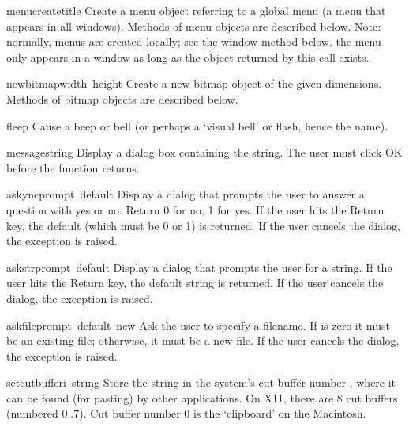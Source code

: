 \begin{funcdesc}{menucreate}{title}
Create a menu object referring to a global menu (a menu that appears in
all windows).
Methods of menu objects are described below.
Note: normally, menus are created locally; see the window method
 below.
 the menu only appears in a window as long as the object
returned by this call exists.
\end{funcdesc}

\begin{funcdesc}{newbitmap}{width\, height}
Create a new bitmap object of the given dimensions.
Methods of bitmap objects are described below.
\end{funcdesc}

\begin{funcdesc}{fleep}{}
Cause a beep or bell (or perhaps a `visual bell' or flash, hence the
name).
\end{funcdesc}

\begin{funcdesc}{message}{string}
Display a dialog box containing the string.
The user must click OK before the function returns.
\end{funcdesc}

\begin{funcdesc}{askync}{prompt\, default}
Display a dialog that prompts the user to answer a question with yes or
no.
Return 0 for no, 1 for yes.
If the user hits the Return key, the default (which must be 0 or 1) is
returned.
If the user cancels the dialog, the
exception is raised.
\end{funcdesc}

\begin{funcdesc}{askstr}{prompt\, default}
Display a dialog that prompts the user for a string.
If the user hits the Return key, the default string is returned.
If the user cancels the dialog, the
exception is raised.
\end{funcdesc}

\begin{funcdesc}{askfile}{prompt\, default\, new}
Ask the user to specify a filename.
If
is zero it must be an existing file; otherwise, it must be a new file.
If the user cancels the dialog, the
exception is raised.
\end{funcdesc}

\begin{funcdesc}{setcutbuffer}{i\, string}
Store the string in the system's cut buffer number
,
where it can be found (for pasting) by other applications.
On X11, there are 8 cut buffers (numbered 0..7).
Cut buffer number 0 is the `clipboard' on the Macintosh.
\end{funcdesc}

